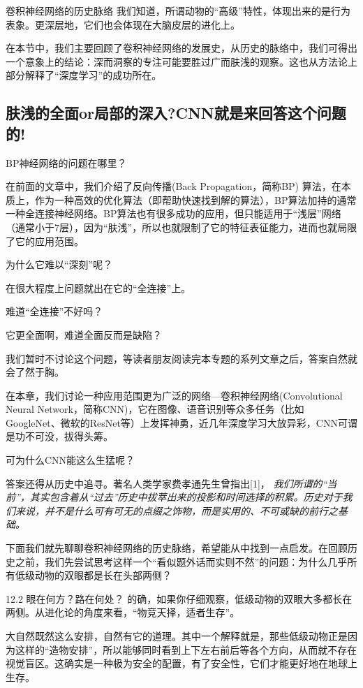 卷积神经网络的历史脉络
我们知道，所谓动物的“高级”特性，体现出来的是行为表象。更深层地，它们也会体现在大脑皮层的进化上。

在本节中，我们主要回顾了卷积神经网络的发展史，从历史的脉络中，我们可得出一个意象上的结论：深而洞察的专注可能要胜过广而肤浅的观察。这也从方法论上部分解释了“深度学习”的成功所在。

\subsection{肤浅的全面or局部的深入?CNN就是来回答这个问题的!}
BP神经网络的问题在哪里？

在前面的文章中，我们介绍了反向传播(Back Propagation，简称BP) 算法，在本质上，作为一种高效的优化算法（即帮助快速找到解的算法），BP算法加持的通常一种全连接神经网络。BP算法也有很多成功的应用，但只能适用于“浅层”网络（通常小于7层），因为“肤浅”，所以也就限制了它的特征表征能力，进而也就局限了它的应用范围。

为什么它难以“深刻”呢？

在很大程度上问题就出在它的“全连接”上。

难道“全连接”不好吗？

它更全面啊，难道全面反而是缺陷？

我们暂时不讨论这个问题，等读者朋友阅读完本专题的系列文章之后，答案自然就会了然于胸。

在本章，我们讨论一种应用范围更为广泛的网络---卷积神经网络(Convolutional Neural Network，简称CNN)，它在图像、语音识别等众多任务（比如GoogleNet、微软的ResNet等）上发挥神勇，近几年深度学习大放异彩，CNN可谓是功不可没，拔得头筹。

可为什么CNN能这么生猛呢？

答案还得从历史中追寻。著名人类学家费孝通先生曾指出[1]，
{\em 我们所谓的“当前”，其实包含着从“过去”历史中拔萃出来的投影和时间选择的积累。历史对于我们来说，并不是什么可有可无的点缀之饰物，而是实用的、不可或缺的前行之基础。}

下面我们就先聊聊卷积神经网络的历史脉络，希望能从中找到一点启发。在回顾历史之前，我们先尝试思考这样一个“看似题外话而实则不然”的问题：为什么几乎所有低级动物的双眼都是长在头部两侧？

12.2 眼在何方？路在何处？
的确，如果你仔细观察，低级动物的双眼大多都长在两侧。从进化论的角度来看，“物竞天择，适者生存”。

大自然既然这么安排，自然有它的道理。其中一个解释就是，那些低级动物正是因为这样的“造物安排”，所以能够同时看到上下左右前后等各个方向，从而就不存在视觉盲区。这确实是一种极为安全的配置，有了安全性，它们才能更好地在地球上生存。

